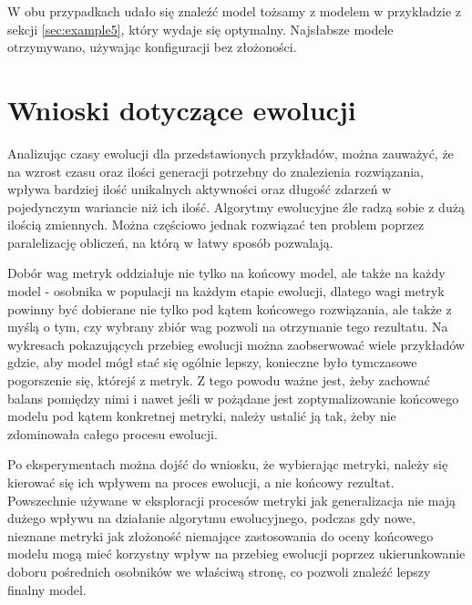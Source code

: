 W obu przypadkach udało się znaleźć model tożsamy z modelem w przykładzie z sekcji \ref{sec:example5}, który wydaje się optymalny. Najsłabsze modele otrzymywano, używając konfiguracji bez złożoności.

\section{Wnioski dotyczące ewolucji}
Analizując czasy ewolucji dla przedstawionych przykładów, można zauważyć, że na wzrost czasu oraz ilości generacji potrzebny do znalezienia rozwiązania, wpływa bardziej ilość unikalnych aktywności oraz długość zdarzeń w pojedynczym wariancie niż ich ilość. Algorytmy ewolucyjne źle radzą sobie z dużą ilością zmiennych. Można częściowo jednak rozwiązać ten problem poprzez paralelizację obliczeń, na którą w łatwy sposób pozwalają. 

Dobór wag metryk oddziałuje nie tylko na końcowy model, ale także na każdy model - osobnika w populacji na każdym etapie ewolucji, dlatego wagi metryk powinny być dobierane nie tylko pod kątem końcowego rozwiązania, ale także z myślą o tym, czy wybrany zbiór wag pozwoli na otrzymanie tego rezultatu. Na wykresach pokazujących przebieg ewolucji można zaobserwować wiele przykładów gdzie, aby model mógł stać się ogólnie lepszy, konieczne było tymczasowe pogorszenie się, którejś z metryk. Z tego powodu ważne jest, żeby zachować balans pomiędzy nimi i nawet jeśli w pożądane jest zoptymalizowanie końcowego modelu pod kątem konkretnej metryki, należy ustalić ją tak, żeby nie zdominowała całego procesu ewolucji. 

Po eksperymentach można dojść do wniosku, że wybierając metryki, należy się kierować się ich wpływem na proces ewolucji, a nie końcowy rezultat. Powszechnie używane w eksploracji procesów metryki jak generalizacja nie mają dużego wpływu na działanie algorytmu ewolucyjnego, podczas gdy nowe, nieznane metryki jak złożoność niemające zastosowania do oceny końcowego modelu mogą mieć korzystny wpływ na przebieg ewolucji poprzez ukierunkowanie doboru pośrednich osobników we właściwą stronę, co pozwoli znaleźć lepszy finalny model.
